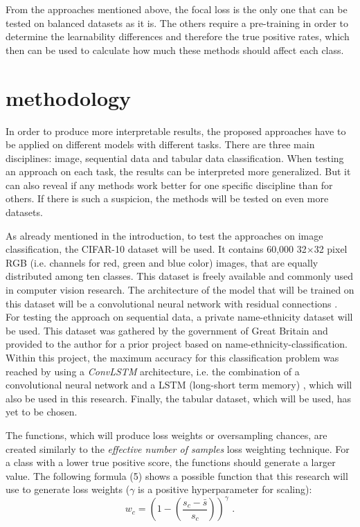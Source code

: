 \documentclass[journal]{IEEEtran}
\begin{document}
From the approaches mentioned above, the focal loss is the only one that can be tested on balanced datasets as it is. 
The others require a pre-training in order to determine the learnability differences and therefore the true positive rates, which then can be used to calculate how much these methods should affect each class.

\section{methodology}
In order to produce more interpretable results, the proposed approaches have to be applied on different models with different tasks. 
There are three main disciplines: image, sequential data and tabular data classification. 
When testing an approach on each task, the results can be interpreted more generalized. 
But it can also reveal if any methods work better for one specific discipline than for others. 
If there is such a suspicion, the methods will be tested on even more datasets.

As already mentioned in the introduction, to test the approaches on image classification, the CIFAR-10 dataset will be used.
It contains 60,000 32$\times$32 pixel RGB (i.e. channels for red, green and blue color) images, that are equally distributed among ten classes.
This dataset is freely available and commonly used in computer vision research.
The architecture of the model that will be trained on this dataset will be a convolutional neural network \cite{lecun1989backpropagation} with residual connections \cite{he2016deep}.
For testing the approach on sequential data, a private name-ethnicity dataset will be used.
This dataset was gathered by the government of Great Britain and provided to the author for a prior project based on name-ethnicity-classification.
Within this project, the maximum accuracy for this classification problem was reached by using a \emph{ConvLSTM} architecture, i.e. the combination of a convolutional neural network and a LSTM (long-short term memory) \cite{gers2000learning}, which will also be used in this research. 
Finally, the tabular dataset, which will be used, has yet to be chosen.

The functions, which will produce loss weights or oversampling chances, are created similarly to the \emph{effective number of samples} loss weighting technique. 
For a class with a lower true positive score, the functions should generate a larger value. 
The following formula (5) shows a possible function that this research will use to generate loss weights ($\gamma$ is a positive hyperparameter for scaling):
\[ w_c = \left(1-\left(\frac{s_c - \bar{s}}{s_c}\right)\right)^\gamma \text{ .} \tag{5} \]
\end{document}
